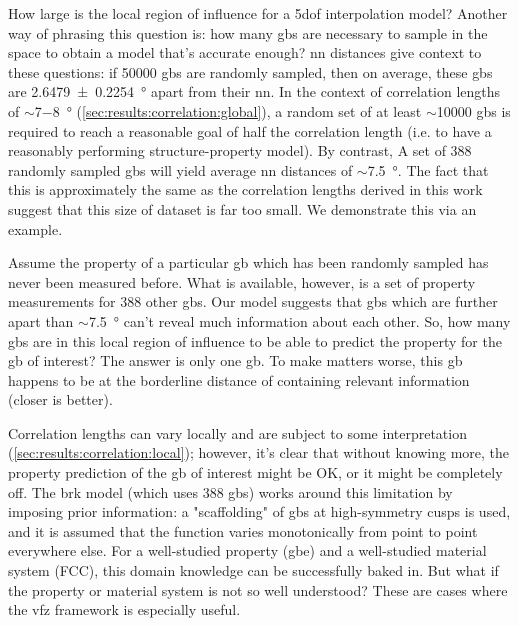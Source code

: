 \documentclass[final,twocolumn,12pt]{elsarticle}
\begin{document}
	How large is the local region of influence for a \gls{5dof} interpolation model? Another way of phrasing this question is: how many \glspl{gb} are necessary to sample in the space to obtain a model that's accurate enough? \Gls{nn} distances give context to these questions: if \num{50000} \glspl{gb} are randomly sampled, then on average, these \glspl{gb} are \SI{2.6479 \pm 0.2254}{\degree} apart from their \gls{nn}. In the context of correlation lengths of $\sim$\num{7}$-$\SI{8}{\degree} (\cref{sec:results:correlation:global}), a random set of at least $\sim$\num{10000} \glspl{gb} is required to reach a reasonable goal of half the correlation length (i.e. to have a reasonably performing structure-property model). By contrast, A set of \num{388} randomly sampled \glspl{gb} will yield average \gls{nn} distances of $\sim$\SI{7.5}{\degree}. The fact that this is approximately the same as the correlation lengths derived in this work suggest that this size of dataset is far too small. We demonstrate this via an example.
	
	Assume the property of a particular \gls{gb} which has been randomly sampled has never been measured before. What is available, however, is a set of property measurements for \num{388} other \glspl{gb}. Our model suggests that \glspl{gb} which are further apart than $\sim$\SI{7.5}{\degree} can't reveal much information about each other. So, how many \glspl{gb} are in this local region of influence to be able to predict the property for the \gls{gb} of interest? The answer is only one \gls{gb}. To make matters worse, this \gls{gb} happens to be at the borderline distance of containing relevant information (closer is better).
	
	Correlation lengths can vary locally and are subject to some interpretation (\cref{sec:results:correlation:local}); however, it's clear that without knowing more, the property prediction of the \gls{gb} of interest might be OK, or it might be completely off. The \gls{brk} \cite{bulatovGrainBoundaryEnergy2014} model (which uses \num{388} \glspl{gb}) works around this limitation by imposing prior information: a "scaffolding" of \glspl{gb} at high-symmetry cusps is used, and it is assumed that the function varies monotonically from point to point everywhere else. For a well-studied property (\gls{gbe}) and a well-studied material system (FCC), this domain knowledge can be successfully baked in. But what if the property or material system is not so well understood? These are cases where the \gls{vfz} framework is especially useful.
\end{document}
